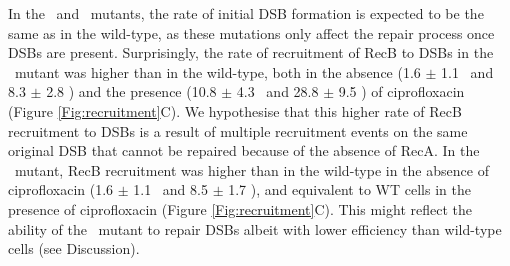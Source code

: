 In the \dreca\ and \geneteneighty\ mutants, the rate of initial DSB formation is expected to be the same as in the wild-type, as these mutations only affect the repair process once DSBs are present. Surprisingly, the rate of recruitment of RecB to DSBs in the \dreca\ mutant was higher than in the wild-type, both in the absence (1.6 $\pm$ 1.1 \ph\ and 8.3 $\pm$ 2.8 \ph) and the presence (10.8 $\pm$ 4.3 \ph\ and 28.8 $\pm$ 9.5 \ph) of ciprofloxacin (Figure \ref{Fig:recruitment}C). We hypothesise that this higher rate of RecB recruitment to DSBs is a result of multiple recruitment events on the same original DSB that cannot be repaired because of the absence of RecA. In the \geneteneighty\ mutant, RecB recruitment was higher than in the wild-type in the absence of ciprofloxacin (1.6 $\pm$ 1.1 \ph\ and 8.5 $\pm$ 1.7 \ph), and equivalent to WT cells in the presence of ciprofloxacin (Figure \ref{Fig:recruitment}C). This might reflect the ability of the \geneteneighty\ mutant to repair DSBs albeit with lower efficiency than wild-type cells (see Discussion).

